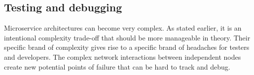 \subsection{Testing and debugging}
Microservice architectures can become very complex. As stated earlier, it is an intentional complexity trade-off that should be more manageable in theory.
Their specific brand of complexity gives rise to a specific brand of headaches for testers and developers.
The complex network interactions between independent nodes create new potential points of failure that can be hard to track and debug.
